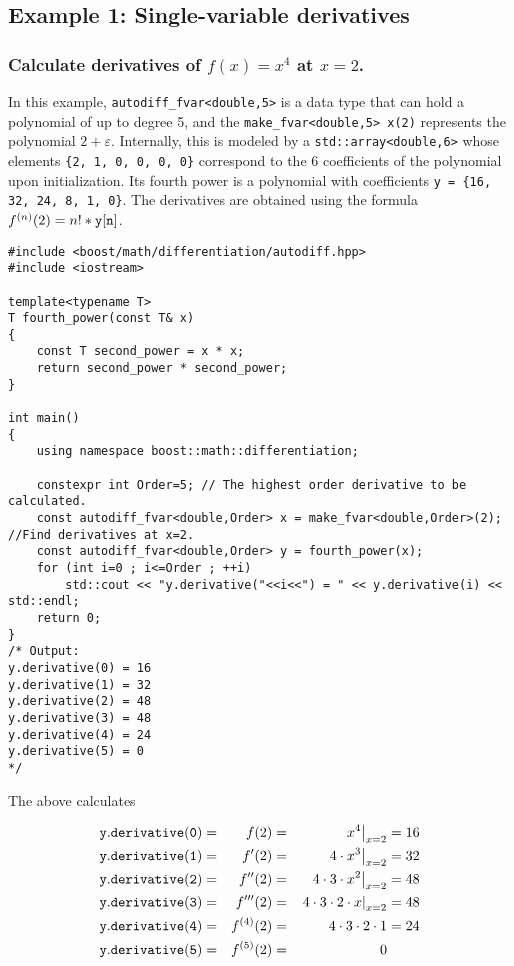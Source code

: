 \documentclass{article}
\begin{document}
\subsection{Example 1: Single-variable derivatives}

\subsubsection{Calculate derivatives of $f(x)=x^4$ at $x=2$.}

In this example, {\tt autodiff\_fvar<double,5>} is a data type that can hold a polynomial of up to degree 5,
and the {\tt make\_fvar<double,5> x(2)} represents the polynomial $2+\varepsilon$.  Internally, this is modeled
by a {\tt std::array<double,6>} whose elements {\tt \{2, 1, 0, 0, 0, 0\}} correspond to the 6 coefficients of
the polynomial upon initialization. Its fourth power is a polynomial with coefficients {\tt y = \{16, 32, 24, 8,
1, 0\}}.  The derivatives are obtained using the formula $f^{(n)}(2)=n!*{\tt y[n]}$.

\begin{verbatim}
#include <boost/math/differentiation/autodiff.hpp>
#include <iostream>

template<typename T>
T fourth_power(const T& x)
{
    const T second_power = x * x;
    return second_power * second_power;
}

int main()
{
    using namespace boost::math::differentiation;

    constexpr int Order=5; // The highest order derivative to be calculated.
    const autodiff_fvar<double,Order> x = make_fvar<double,Order>(2); //Find derivatives at x=2.
    const autodiff_fvar<double,Order> y = fourth_power(x);
    for (int i=0 ; i<=Order ; ++i)
        std::cout << "y.derivative("<<i<<") = " << y.derivative(i) << std::endl;
    return 0;
}
/* Output:
y.derivative(0) = 16
y.derivative(1) = 32
y.derivative(2) = 48
y.derivative(3) = 48
y.derivative(4) = 24
y.derivative(5) = 0
*/
\end{verbatim}
The above calculates

\begin{alignat*}{3}
{\tt y.derivative(0)} &=& f(2) =&& \left.x^4\right|_{x=2} &= 16\\
{\tt y.derivative(1)} &=& f'(2) =&& \left.4\cdot x^3\right|_{x=2} &= 32\\
{\tt y.derivative(2)} &=& f''(2) =&& \left.4\cdot 3\cdot x^2\right|_{x=2} &= 48\\
{\tt y.derivative(3)} &=& f'''(2) =&& \left.4\cdot 3\cdot2\cdot x\right|_{x=2} &= 48\\
{\tt y.derivative(4)} &=& f^{(4)}(2) =&& 4\cdot 3\cdot2\cdot1 &= 24\\
{\tt y.derivative(5)} &=& f^{(5)}(2) =&& 0 &
\end{alignat*}
\end{document}
